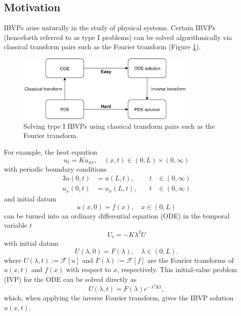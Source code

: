 \documentclass[12pt, oneside, a4paper]{article}
\begin{document}
\subsection{Motivation}\label{sec:motivation}

IBVPs arise naturally in the study of physical systems. Certain IBVPs (henceforth referred to as type I problems) can be solved algorithmically via classical transform pairs such as the Fourier transform (Figure \ref{fig:classical_transform}). 
\begin{figure}[htpb!]
    \centering
    \includegraphics[width=0.8\textwidth]{classical_transform.png}
    \caption{Solving type I IBVPs using classical transform pairs such as the Fourier transform.}
    \label{fig:classical_transform}
\end{figure}

\noindent For example, the heat equation \cite{Pinsky1991}
\[u_t = Ku_{xx},\quad (x,t)\in (0, L)\times (0,\infty)\]
with periodic boundary conditions
\begin{alignat*}{3}
    u(0, t) &= u(L, t),&\quad t&\in (0,\infty)\\
    u_x(0, t) &= u_x(L, t),&\quad t&\in (0,\infty)
\end{alignat*}
and initial datum
\[u(x,0) = f(x), \quad x\in (0, L)\]
can be turned into an ordinary differential equation (ODE) in the temporal variable $t$
\[U_t = -K\lambda^2U\]
with initial datum
\[U(\lambda,0) = F(\lambda),\quad \lambda\in (0,L).\]
where $U(\lambda,t):=\mathcal{F}[u]$ and $F(\lambda):=\mathcal{F}[f]$ are the Fourier transforms of $u(x,t)$ and $f(x)$ with respect to $x$, respectively. This initial-value problem (IVP) for the ODE can be solved directly as 
\[U(\lambda,t) = F(\lambda)e^{-\lambda^2 K t},\]
which, when applying the inverse Fourier transform, gives the IBVP solution $u(x,t)$.

\end{document}
